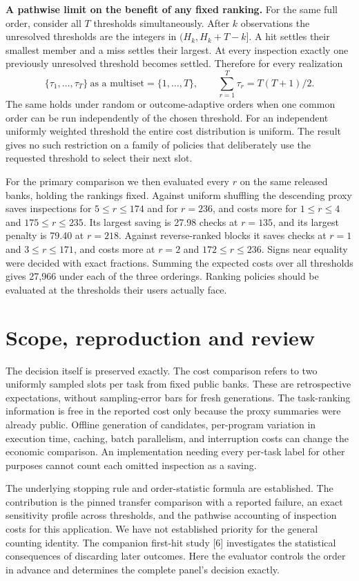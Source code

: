 \documentclass[10pt,a4paper]{article}
\begin{document}
\textbf{A pathwise limit on the benefit of any fixed ranking.}
For the same full order, consider all $T$ thresholds simultaneously. After $k$ observations the unresolved thresholds are the integers in $(H_k,H_k+T-k]$. A hit settles their smallest member and a miss settles their largest. At every inspection exactly one previously unresolved threshold becomes settled. Therefore for every realization
\[
\{\tau_1,\ldots,\tau_T\}\ \text{as a multiset}=\{1,\ldots,T\},
\qquad \sum_{r=1}^T\tau_r=T(T+1)/2 .
\]
The same holds under random or outcome-adaptive orders when one common order can be run independently of the chosen threshold. For an independent uniformly weighted threshold the entire cost distribution is uniform. The result gives no such restriction on a family of policies that deliberately use the requested threshold to select their next slot.

For the primary comparison we then evaluated every $r$ on the same released banks, holding the rankings fixed. Against uniform shuffling the descending proxy saves inspections for $5\le r\le174$ and for $r=236$, and costs more for $1\le r\le4$ and $175\le r\le235$. Its largest saving is 27.98 checks at $r=135$, and its largest penalty is 79.40 at $r=218$. Against reverse-ranked blocks it saves checks at $r=1$ and $3\le r\le171$, and costs more at $r=2$ and $172\le r\le236$. Signs near equality were decided with exact fractions. Summing the expected costs over all thresholds gives 27,966 under each of the three orderings. Ranking policies should be evaluated at the thresholds their users actually face.

\newpage
\section{Scope, reproduction and review}
The decision itself is preserved exactly. The cost comparison refers to two uniformly sampled slots per task from fixed public banks. These are retrospective expectations, without sampling-error bars for fresh generations. The task-ranking information is free in the reported cost only because the proxy summaries were already public. Offline generation of candidates, per-program variation in execution time, caching, batch parallelism, and interruption costs can change the economic comparison. An implementation needing every per-task label for other purposes cannot count each omitted inspection as a saving.

The underlying stopping rule and order-statistic formula are established. The contribution is the pinned transfer comparison with a reported failure, an exact sensitivity profile across thresholds, and the pathwise accounting of inspection costs for this application. We have not established priority for the general counting identity. The companion first-hit study [6] investigates the statistical consequences of discarding later outcomes. Here the evaluator controls the order in advance and determines the complete panel's decision exactly.
\end{document}
